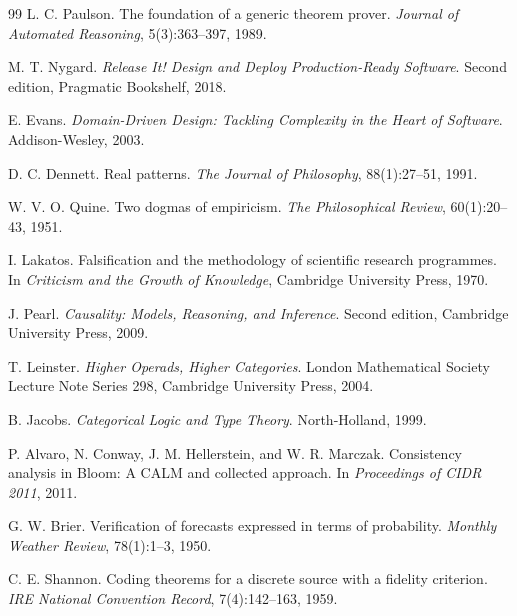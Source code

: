 \begin{thebibliography}{99}
L. C. Paulson.
\newblock The foundation of a generic theorem prover.
\newblock \emph{Journal of Automated Reasoning}, 5(3):363--397, 1989.

M. T. Nygard.
\newblock \emph{Release It! Design and Deploy Production-Ready Software}.
\newblock Second edition, Pragmatic Bookshelf, 2018.

E. Evans.
\newblock \emph{Domain-Driven Design: Tackling Complexity in the Heart of Software}.
\newblock Addison-Wesley, 2003.


D. C. Dennett.
\newblock Real patterns.
\newblock \emph{The Journal of Philosophy}, 88(1):27--51, 1991.

W. V. O. Quine.
\newblock Two dogmas of empiricism.
\newblock \emph{The Philosophical Review}, 60(1):20--43, 1951.

I. Lakatos.
\newblock Falsification and the methodology of scientific research programmes.
\newblock In \emph{Criticism and the Growth of Knowledge}, Cambridge University Press,
1970.

J. Pearl.
\newblock \emph{Causality: Models, Reasoning, and Inference}.
\newblock Second edition, Cambridge University Press, 2009.


T. Leinster.
\newblock \emph{Higher Operads, Higher Categories}.
\newblock London Mathematical Society Lecture Note Series 298, Cambridge University
Press, 2004.

B. Jacobs.
\newblock \emph{Categorical Logic and Type Theory}.
\newblock North-Holland, 1999.

P. Alvaro, N. Conway, J. M. Hellerstein, and W. R. Marczak.
\newblock Consistency analysis in Bloom: A CALM and collected approach.
\newblock In \emph{Proceedings of CIDR 2011}, 2011.

G. W. Brier.
\newblock Verification of forecasts expressed in terms of probability.
\newblock \emph{Monthly Weather Review}, 78(1):1--3, 1950.

C. E. Shannon.
\newblock Coding theorems for a discrete source with a fidelity criterion.
\newblock \emph{IRE National Convention Record}, 7(4):142--163, 1959.


\end{thebibliography}

